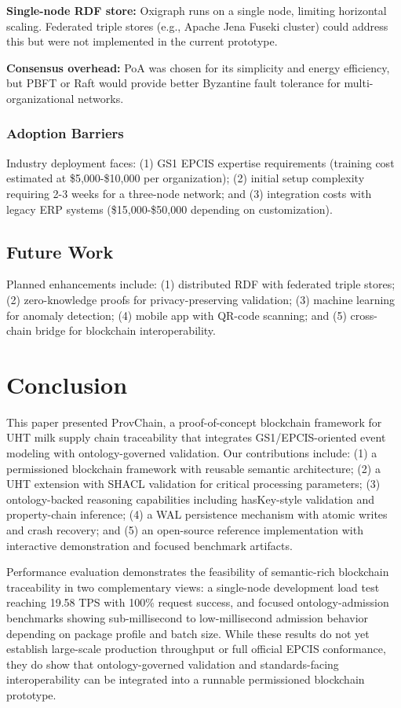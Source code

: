 \documentclass[preprint,review,12pt,authoryear]{elsarticle}
\begin{document}
\textbf{Single-node RDF store:} Oxigraph runs on a single node, limiting horizontal scaling. Federated triple stores (e.g., Apache Jena Fuseki cluster) could address this but were not implemented in the current prototype.

\textbf{Consensus overhead:} PoA was chosen for its simplicity and energy efficiency, but PBFT or Raft would provide better Byzantine fault tolerance for multi-organizational networks.

\subsubsection{Adoption Barriers}

Industry deployment faces: (1) GS1 EPCIS expertise requirements (training cost estimated at \$5,000-\$10,000 per organization); (2) initial setup complexity requiring 2-3 weeks for a three-node network; and (3) integration costs with legacy ERP systems (\$15,000-\$50,000 depending on customization).

\subsection{Future Work}

Planned enhancements include: (1) distributed RDF with federated triple stores; (2) zero-knowledge proofs for privacy-preserving validation; (3) machine learning for anomaly detection; (4) mobile app with QR-code scanning; and (5) cross-chain bridge for blockchain interoperability.

\section{Conclusion}\label{sec:conclusion}

This paper presented ProvChain, a proof-of-concept blockchain framework for UHT milk supply chain traceability that integrates GS1/EPCIS-oriented event modeling with ontology-governed validation. Our contributions include: (1) a permissioned blockchain framework with reusable semantic architecture; (2) a UHT extension with SHACL validation for critical processing parameters; (3) ontology-backed reasoning capabilities including hasKey-style validation and property-chain inference; (4) a WAL persistence mechanism with atomic writes and crash recovery; and (5) an open-source reference implementation with interactive demonstration and focused benchmark artifacts.

Performance evaluation demonstrates the feasibility of semantic-rich blockchain traceability in two complementary views: a single-node development load test reaching 19.58 TPS with 100\% request success, and focused ontology-admission benchmarks showing sub-millisecond to low-millisecond admission behavior depending on package profile and batch size. While these results do not yet establish large-scale production throughput or full official EPCIS conformance, they do show that ontology-governed validation and standards-facing interoperability can be integrated into a runnable permissioned blockchain prototype.
\end{document}
